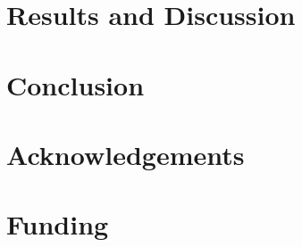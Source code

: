 \documentclass{bioinfo}
\begin{document}
\begin{methods}


\end{methods}
\section{Results and Discussion}



\section{Conclusion}

\section*{Acknowledgements}

\section*{Funding}



\end{document}
